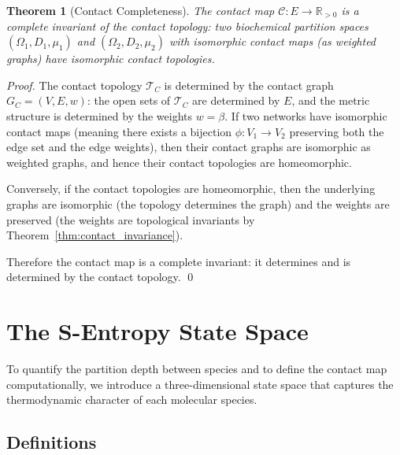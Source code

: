 \documentclass[11pt,twocolumn]{article}
\theoremstyle{plain}
\newtheorem{theorem}{Theorem}[section]
\theoremstyle{definition}
\newcommand{\CC}{\mathcal{C}}
\newcommand{\reals}{\mathbb{R}}
\begin{document}
\begin{theorem}[Contact Completeness]
\label{thm:contact_completeness}
The contact map $\CC: E \to \reals_{>0}$ is a complete invariant of the
contact topology: two biochemical partition spaces $(\Omega_1, D_1, \mu_1)$ and
$(\Omega_2, D_2, \mu_2)$ with isomorphic contact maps (as weighted graphs)
have isomorphic contact topologies.
\end{theorem}

\begin{proof}
The contact topology $\mathcal{T}_C$ is determined by the contact graph
$G_C = (V, E, w)$: the open sets of $\mathcal{T}_C$ are determined by $E$, and
the metric structure is determined by the weights $w = \beta$. If two networks
have isomorphic contact maps (meaning there exists a bijection $\phi: V_1 \to
V_2$ preserving both the edge set and the edge weights), then their contact
graphs are isomorphic as weighted graphs, and hence their contact topologies are
homeomorphic.

Conversely, if the contact topologies are homeomorphic, then the underlying
graphs are isomorphic (the topology determines the graph) and the weights
are preserved (the weights are topological invariants by
Theorem~\ref{thm:contact_invariance}).

Therefore the contact map is a complete invariant: it determines and is
determined by the contact topology. \qed
\end{proof}


\section{The S-Entropy State Space}
\label{sec:sentropy}

To quantify the partition depth between species and to define the contact map
computationally, we introduce a three-dimensional state space that captures the
thermodynamic character of each molecular species.

\subsection{Definitions}
\end{document}
